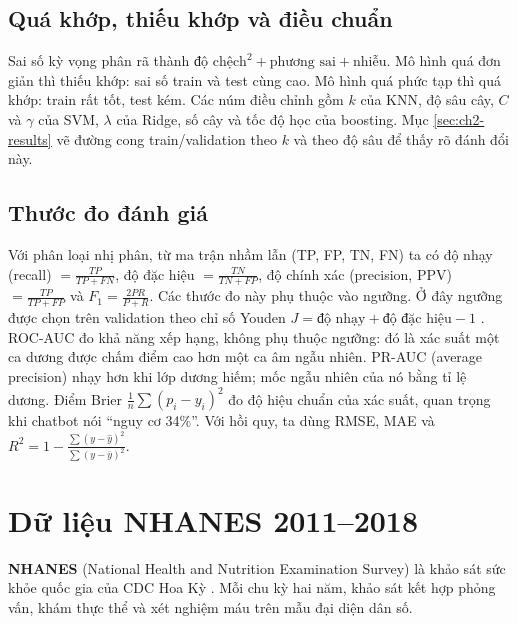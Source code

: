 \subsection{Quá khớp, thiếu khớp và điều chuẩn}

Sai số kỳ vọng phân rã thành $\text{độ chệch}^2 + \text{phương sai} + \text{nhiễu}$. Mô hình quá đơn giản thì thiếu khớp: sai số train và test cùng cao. Mô hình quá phức tạp thì quá khớp: train rất tốt, test kém. Các núm điều chỉnh gồm $k$ của KNN, độ sâu cây, $C$ và $\gamma$ của SVM, $\lambda$ của Ridge, số cây và tốc độ học của boosting. Mục \ref{sec:ch2-results} vẽ đường cong train/validation theo $k$ và theo độ sâu để thấy rõ đánh đổi này.

\subsection{Thước đo đánh giá}

Với phân loại nhị phân, từ ma trận nhầm lẫn (TP, FP, TN, FN) ta có độ nhạy (recall) $= \frac{TP}{TP+FN}$, độ đặc hiệu $=\frac{TN}{TN+FP}$, độ chính xác (precision, PPV) $=\frac{TP}{TP+FP}$ và $F_1 = \frac{2PR}{P+R}$. Các thước đo này phụ thuộc vào ngưỡng. Ở đây ngưỡng được chọn trên validation theo chỉ số Youden $J=\text{độ nhạy}+\text{độ đặc hiệu}-1$ \cite{youden1950}. ROC-AUC đo khả năng xếp hạng, không phụ thuộc ngưỡng: đó là xác suất một ca dương được chấm điểm cao hơn một ca âm ngẫu nhiên. PR-AUC (average precision) nhạy hơn khi lớp dương hiếm; mốc ngẫu nhiên của nó bằng tỉ lệ dương. Điểm Brier $\frac1n\sum(p_i-y_i)^2$ đo độ hiệu chuẩn của xác suất, quan trọng khi chatbot nói ``nguy cơ 34\%''. Với hồi quy, ta dùng RMSE, MAE và $R^2 = 1-\frac{\sum(y-\hat y)^2}{\sum(y-\bar y)^2}$.

\section{Dữ liệu NHANES 2011–2018}

\textbf{NHANES} (National Health and Nutrition Examination Survey) là khảo sát sức khỏe quốc gia của CDC Hoa Kỳ \cite{nhanes}. Mỗi chu kỳ hai năm, khảo sát kết hợp phỏng vấn, khám thực thể và xét nghiệm máu trên mẫu đại diện dân số.


